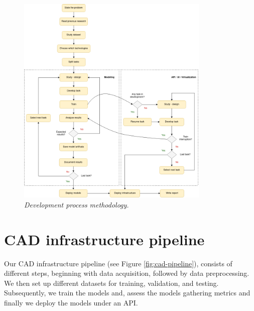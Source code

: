 \newpage

\begin{landscape}

  \begin{figure}[H]
  \centering
  \includegraphics[width=0.82\textwidth]{imatges/planing_and_methodology/EmplyedMethodology.png}
  \caption{\textit{Development process methodology.}}
  \label{fig:flux_development}
  \end{figure}

\end{landscape}

\newpage

\section{CAD infrastructure pipeline}

Our CAD infrastructure pipeline  (see Figure \ref{fig:cad-pipeline}), consists of different steps, beginning with data acquisition, followed by data preprocessing. We then set up different datasets for training, validation, and testing. Subsequently, we train the models and, assess the models gathering metrics and finally we deploy the models under an API.



